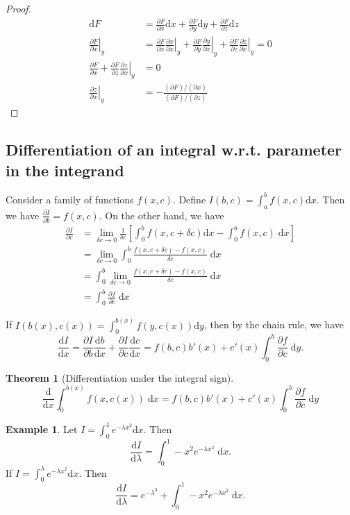 \documentclass[a4paper]{article}
\theoremstyle{definition}
\newtheorem*{thm}{Theorem}
\newtheorem*{eg}{Example}
\renewcommand{\d}{\mathrm{d}}
\begin{document}
\begin{proof}
  \begin{align*}
  \d F &= \frac{\partial F}{\partial x}\d x + \frac{\partial F}{\partial y}\d y + \frac{\partial F}{\partial z}\d z\\
  \left.\frac{\partial F}{\partial x}\right|_y &= \frac{\partial F}{\partial x}\left.\frac{\partial x}{\partial x}\right|_y + \frac{\partial F}{\partial y}\left.\frac{\partial y}{\partial x}\right|_y + \frac{\partial F}{\partial z}\left.\frac{\partial z}{\partial x}\right|_y = 0\\
  \frac{\partial F}{\partial x} + \frac{\partial F}{\partial z}\left.\frac{\partial z}{\partial x}\right|_y &= 0\\
  \left.\frac{\partial z}{\partial x}\right|_y &= -\frac{(\partial F)/(\partial x)}{(\partial F)/(\partial z)}
\end{align*}
\end{proof}
\subsection{Differentiation of an integral w.r.t. parameter in the integrand}
Consider a family of functions $f(x, c)$. Define $I(b, c) = \int_a^bf(x, c)\d x$. Then we have $\frac{\partial I}{\partial b} = f(x, c)$. On the other hand, we have
\begin{align*}
  \frac{\partial I}{\partial c} &= \lim_{\delta c\to 0}\frac{1}{\delta c}\left[\int_0^bf(x, c + \delta c)\d x - \int_0^b f(x, c)\;\d x\right]\\
  &= \lim_{\delta c\to 0}\int_0^b\frac{f(x, c + \delta c) - f(x, c)}{\delta c}\;\d x\\
  &= \int_0^b\lim_{\delta c\to 0}\frac{f(x, c + \delta c) - f(x, c)}{\delta c}\;\d x\\
  &= \int_0^b\frac{\partial f}{\partial c}\;\d x
\end{align*}

If $I(b(x), c(x)) = \int_0^{b(x)} f(y, c(x))\d y$, then by the chain rule, we have
\[
\frac{\d I}{\d x} = \frac{\partial I}{\partial b}\frac{\d b}{\d x} + \frac{\partial I}{\partial c}\frac{\d c}{\d x} = f(b, c)b'(x) + c'(x) \int_0^b\frac{\partial f}{\partial c}\;\d y.
\]

\begin{thm}[Differentiation under the integral sign]
  \[
  \frac{\d}{\d x} \int_{0}^{b(x)} f(x, c(x))\;\d x= f(b, c)b'(x) + c'(x)\int_0^b \frac{\partial f}{\partial c}\;\d y
  \]
\end{thm}
\begin{eg}
  Let $I = \int_0^1 e^{-\lambda x^2}\d x$. Then
  \[
  \frac{\d I}{\d \lambda} = \int_0^1-x^2e^{-\lambda x^2}\;\d x.
  \]
  If $I = \int_0^\lambda e^{-\lambda x^2}\d x$. Then
  \[
  \frac{\d I}{\d \lambda} = e^{-\lambda^3} + \int_0^1-x^2e^{-\lambda x^2}\;\d x.
  \]
\end{eg}
\end{document}
